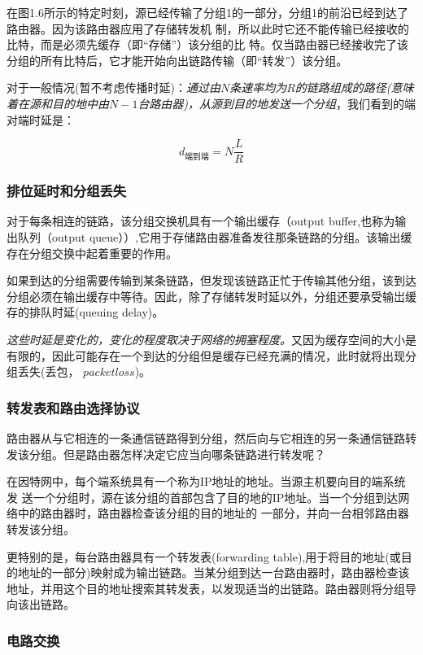     在图1.6所示的特定时刻，源已经传输了分组1的一部分，分组1的前沿已经到达了路由器。因为该路由器应用了存储转发机 制，所以此时它还不能传输已经接收的比特，而是必须先缓存（即“存储”）该分组的比 特。仅当路由器已经接收完了该分组的所有比特后，它才能开始向出链路传输（即“转发”）该分组。

    对于一般情况(暂不考虑传播时延)：\emph{通过由$N$条速率均为$R$的链路组成的路径(意味着在源和目的地中由$N - 1$台路由器)，从源到目的地发送一个分组}，我们看到的端对端时延是：

$$
    d_{端到端} = N\frac{L}{R}
$$

\subsubsection{排位延时和分组丢失}

    对于每条相连的链路，该分组交换机具有一个输出缓存（output buffer,也称为输出队列（output queue））,它用于存储路由器准备发往那条链路的分组。该输出缓存在分组交换中起着重要的作用。

    如果到达的分组需要传输到某条链路，但发现该链路正忙于传输其他分组，该到达分组必须在输出缓存中等待。因此，除了存储转发时延以外，分组还要承受输岀缓存的排队时延(queuing delay)。

    \emph{这些时延是变化的，变化的程度取决于网络的拥塞程度。}又因为缓存空间的大小是有限的，因此可能存在一个到达的分组但是缓存已经充满的情况，此时就将出现分组丢失(丢包， $packet loss$)。

\subsubsection{转发表和路由选择协议}

    路由器从与它相连的一条通信链路得到分组，然后向与它相连的另一条通信链路转发该分组。但是路由器怎样决定它应当向哪条链路进行转发呢？

    在因特网中，每个端系统具有一个称为IP地址的地址。当源主机要向目的端系统发 送一个分组时，源在该分组的首部包含了目的地的IP地址。当一个分组到达网络中的路由器时，路由器检查该分组的目的地址的 一部分，并向一台相邻路由器转发该分组。
    
    更特别的是，每台路由器具有一个转发表(forwarding table),用于将目的地址(或目的地址的一部分)映射成为输岀链路。当某分组到达一台路由器时，路由器检查该地址，并用这个目的地址搜索其转发表，以发现适当的出链路。路由器则将分组导向该出链路。

\subsubsection{电路交换}

